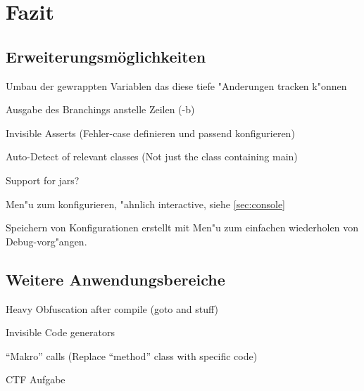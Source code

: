 
\chapter{Fazit}



\section{Erweiterungsmöglichkeiten} 

Umbau der gewrappten Variablen das diese tiefe "Anderungen tracken k"onnen

Ausgabe des Branchings anstelle Zeilen (-b)

Invisible Asserts (Fehler-case definieren und passend konfigurieren)

Auto-Detect of relevant classes (Not just the class containing main)

Support for jars?

Men"u zum konfigurieren, "ahnlich interactive, siehe \ref{sec:console}

Speichern von Konfigurationen erstellt mit Men"u zum einfachen wiederholen von Debug-vorg"angen.

\section{Weitere Anwendungsbereiche} 

Heavy Obfuscation after compile (goto and stuff)

Invisible Code generators

"`Makro"' calls (Replace "`method"' class with specific code)

CTF Aufgabe